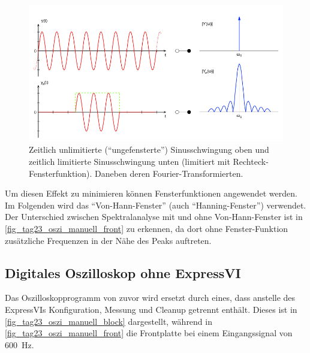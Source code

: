 \documentclass[
a4paper,
12pt,
pagesize,
ngerman
]{scrartcl}
\begin{document}
	\begin{figure}[H]  
		\includegraphics[width=1\textwidth]{EIRE2018Dateien/sonstige_Dateien/leakage}
		\centering
		\caption{
			Zeitlich unlimitierte (\enquote{ungefensterte}) Sinusschwingung oben und zeitlich limitierte Sinusschwingung unten (limitiert mit Rechteck-Fensterfunktion). Daneben deren Fourier-Transformierten. \cite{Leakage} %
		}
		\label{fig_leakage_veranschaulichung}
		\centering
	\end{figure}

	Um diesen Effekt zu minimieren können Fensterfunktionen angewendet werden. %
	Im Folgenden wird das \enquote{Von-Hann-Fenster} (auch \enquote{Hanning-Fenster}) verwendet. %
	Der Unterschied zwischen Spektralanalyse mit und ohne Von-Hann-Fenster ist in \cref{fig_tag23_oszi_manuell_front} zu erkennen, da dort ohne Fenster-Funktion zusätzliche Frequenzen in der Nähe des Peaks auftreten.
	

	\subsection{Digitales Oszilloskop ohne ExpressVI} %
	Das Oszilloskopprogramm von zuvor wird ersetzt durch eines, dass anstelle des ExpressVIs Konfiguration, Messung und Cleanup getrennt enthält.
	Dieses ist in \cref{fig_tag23_oszi_manuell_block} dargestellt, während in \cref{fig_tag23_oszi_manuell_front} die Frontplatte bei einem Eingangssignal von \SI{600}{\hertz}.
	
\end{document}
